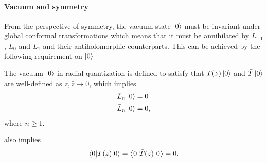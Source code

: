 \documentclass[10pt]{article}
\begin{document}
\paragraph{Vacuum and symmetry}From the perspective of symmetry, the vacuum state $\ket{0}$ must be invariant under global conformal transformations which means that it must be annihilated by $L_{-1}$, $L_0$ and $L_1$ and their antiholomorphic counterparts.
This can be achieved by the following requirement on $\ket{0}$
\begin{property}
    The vacuum $\ket{0}$ in radial quantization is defined to satisfy that $T(z)\ket{0}$ and $\bar{T}\ket{0}$ are well-defined as $z,\bar{z}\to0$, which implies
    \begin{subequations}\label{eq:operator_formalism:hilbert:vacuum:L}
        \begin{align}
            L_n\ket{0}       & =0  \\
            \bar{L}_n\ket{0} & =0,
        \end{align}
    \end{subequations}
    where $n\geq1$.
\end{property}
 also implies
\begin{align}
    \ev**{T(z)}{0}=\ev**{\bar{T}(z)}{0}=0.
\end{align}
\end{document}
